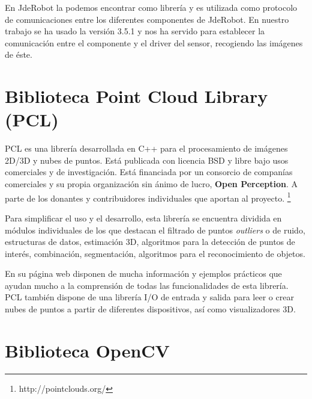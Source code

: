 En JdeRobot la podemos encontrar como librería y es utilizada como protocolo de comunicaciones entre los diferentes componentes de JdeRobot. En nuestro trabajo se ha usado la versión 3.5.1 y nos ha servido para establecer la comunicación entre el componente y el driver del sensor, recogiendo las imágenes de éste.

\section{Biblioteca Point Cloud Library (PCL)}

PCL es una librería desarrollada en C++ para el procesamiento de imágenes 2D/3D y nubes de puntos. Está publicada con licencia BSD y libre bajo usos comerciales y de investigación. Está financiada por un consorcio de companías comerciales y su propia organización sin ánimo de lucro, \textbf{Open Perception}. A parte de los donantes y contribuidores individuales que aportan al proyecto. \footnote{http://pointclouds.org/}

Para simplificar el uso y el desarrollo, esta librería se encuentra dividida en módulos individuales de los que destacan el filtrado de puntos \textit{outliers} o de ruido, estructuras de datos, estimación 3D, algoritmos para la detección de puntos de interés, combinación, segmentación, algoritmos para el reconocimiento de objetos.


En su página web disponen de mucha información y ejemplos prácticos que ayudan mucho a la comprensión de todas las funcionalidades de esta librería. PCL también dispone de una librería I/O de entrada y salida para leer o crear nubes de puntos a partir de diferentes dispositivos, así como visualizadores 3D.


\section{Biblioteca OpenCV}

